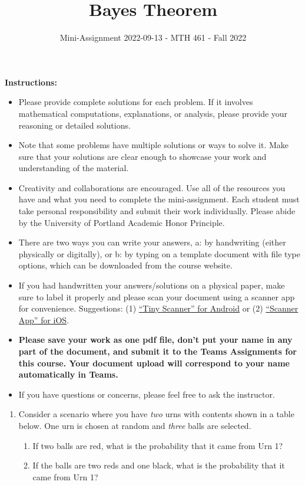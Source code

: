 \documentclass[
]{article}
\title{\textbf{Bayes Theorem}}
\subtitle{Mini-Assignment 2022-09-13 - MTH 461 - Fall 2022}
\author{}
\date{\vspace{-2.5em}}
\providecommand{\tightlist}{%
  \setlength{\itemsep}{0pt}\setlength{\parskip}{0pt}}
\begin{document}
\maketitle

\hfill\break

\textbf{Instructions:}

\begin{itemize}
\item
  Please provide complete solutions for each problem. If it involves mathematical computations, explanations, or analysis, please provide your reasoning or detailed solutions.
\item
  Note that some problems have multiple solutions or ways to solve it. Make sure that your solutions are clear enough to showcase your work and understanding of the material.
\item
  Creativity and collaborations are encouraged. Use all of the resources you have and what you need to complete the mini-assignment. Each student must take personal responsibility and submit their work individually. Please abide by the University of Portland Academic Honor Principle.
\item
  There are two ways you can write your answers, a: by handwriting (either physically or digitally), or b: by typing on a template document with file type options, which can be downloaded from the course website.
\item
  If you had handwritten your answers/solutions on a physical paper, make sure to label it properly and please scan your document using a scanner app for convenience. Suggestions: (1) \href{https://play.google.com/store/apps/details?id=com.appxy.tinyscanner\&hl=en_US\&gl=US}{``Tiny Scanner'' for Android} or (2) \href{https://apps.apple.com/us/app/scanner-app-scan-pdf-document/id595563753}{``Scanner App'' for iOS}.
\item
  \textbf{Please save your work as one pdf file, don't put your name in any part of the document, and submit it to the Teams Assignments for this course. Your document upload will correspond to your name automatically in Teams.}
\item
  If you have questions or concerns, please feel free to ask the instructor.
\end{itemize}

\newpage

\begin{enumerate}
\def\labelenumi{\arabic{enumi}.}
\item
  Consider a scenario where you have \emph{two} urns with contents shown in a table below. One urn is chosen at random and \emph{three} balls are selected.

  \begin{enumerate}
  \def\labelenumii{\alph{enumii}.}
  \tightlist
  \item
    If two balls are red, what is the probability that it came from Urn 1?
  \item
    If the balls are two reds and one black, what is the probability that it came from Urn 1?
  \end{enumerate}
\end{enumerate}
\end{document}
